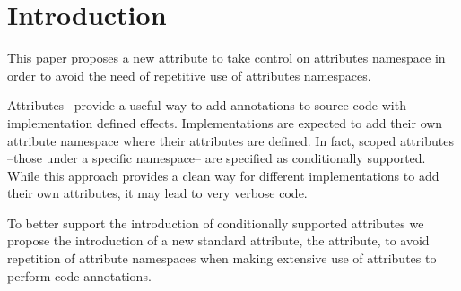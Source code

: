 \section{Introduction}

This paper proposes a new attribute to take control on attributes namespace
in order to avoid the need of repetitive use of attributes namespaces.

Attributes~\cite{n2761} provide a useful way to add annotations to source code with
implementation defined effects. Implementations are expected to add their
own attribute namespace where their attributes are defined. In fact,
scoped attributes --those under a specific namespace-- are specified
as conditionally supported. While this approach
provides a clean way for different implementations to add their own attributes,
it may lead to very verbose code.

To better support the introduction of conditionally supported attributes we
propose the introduction of a new standard attribute, the  attribute,
to avoid repetition of attribute namespaces when making extensive use
of attributes to perform code annotations.
